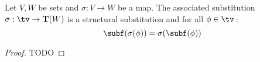 \begin{prop}\label{logic:prop:LAM:substitution:subformula}
Let $V,W$ be sets and $\sigma:V\to W$ be a map. The associated
substitution $\sigma:\tv\to{\bf T}(W)$ is a structural substitution
and for all $\phi\in\tv$\,:
    \[
        \subf(\sigma(\phi))
        =
        \sigma(\subf(\phi))
    \]
\end{prop}
\begin{proof}
    TODO
\end{proof}

